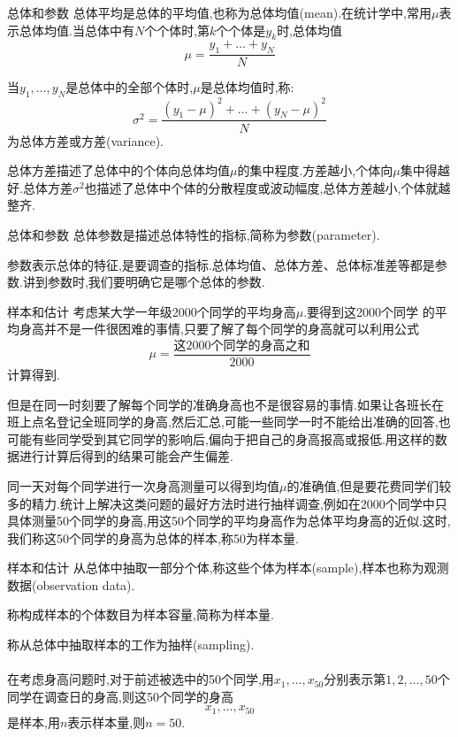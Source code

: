 \begin{frame}{总体和参数}
\alert{总体平均}是总体的平均值,也称为\alert{总体均值}(mean).在统计学中,常用$\mu$表示总体均值.当总体中有$N$个个体时,第$k$个个体是$y_k$时,总体均值
\begin{equation}
\mu = \frac{y_1+\dots+y_N}{N}
\end{equation}

当$y_1,\dots,y_N$是总体中的全部个体时,$\mu$是总体均值时,称:
\begin{equation}
\sigma^2 = \frac{(y_1-\mu)^2+\dots+(y_N-\mu)^2}{N}
\end{equation}
为\alert{总体方差}或方差(variance).

总体方差描述了总体中的个体向总体均值$\mu$的集中程度.方差越小,个体向$\mu$集中得越好.总体方差$\sigma^2$也描述了总体中个体的分散程度或波动幅度,总体方差越小,个体就越整齐.
\end{frame}

\begin{frame}{总体和参数}
\alert{总体参数}是描述总体特性的指标,简称为\alert{参数}(parameter).

参数表示总体的特征,是要调查的指标.总体均值、总体方差、总体标准差等都是参数.讲到参数时,我们要明确它是哪个总体的参数.
\end{frame}

\begin{frame}{样本和估计}
考虑某大学一年级2000个同学的平均身高$\mu$.要得到这2000个同学 的平均身高并不是一件很困难的事情,只要了解了每个同学的身高就可以利用公式
\begin{equation}
\mu = \frac{\text{这2000个同学的身高之和}}{2000}
\end{equation}	
计算得到.

但是在同一时刻要了解每个同学的准确身高也不是很容易的事情.如果让各班长在班上点名登记全班同学的身高,然后汇总,可能一些同学一时不能给出准确的回答,也可能有些同学受到其它同学的影响后,偏向于把自己的身高报高或报低.用这样的数据进行计算后得到的结果可能会产生偏差.

同一天对每个同学进行一次身高测量可以得到均值$\mu$的准确值,但是要花费同学们较多的精力.统计上解决这类问题的最好方法时进行抽样调查,例如在2000个同学中只具体测量50个同学的身高,用这50个同学的平均身高作为总体平均身高的近似.这时,我们称这50个同学的身高为总体的样本,称50为样本量.
\end{frame}

\begin{frame}{样本和估计}
从总体中抽取一部分个体,称这些个体为\alert{样本}(sample),样本也称为\alert{观测数据}(observation data).

称构成样本的个体数目为\alert{样本容量},简称为\alert{样本量}.

称从总体中抽取样本的工作为\alert{抽样}(sampling).
\\ \hspace*{\fill} \\%

在考虑身高问题时,对于前述被选中的50个同学,用$x_1,\dots,x_{50}$分别表示第$1,2,\dots,50$个同学在调查日的身高,则这50个同学的身高
\begin{equation}
x_1,\dots,x_{50}
\end{equation}
是样本,用$n$表示样本量,则$n=50$.
\end{frame}

